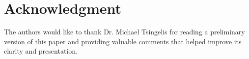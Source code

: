 \documentclass[sn-mathphys-num]{sn-jnl}%
\theoremstyle{thmstyleone}%
\theoremstyle{thmstyletwo}%
\theoremstyle{thmstylethree}%
\numberwithin{equation}{section}
\begin{document}

\section*{Acknowledgment}The authors would like to thank Dr. Michael Tsingelis for reading a preliminary version of this paper and providing valuable comments that helped improve its clarity and presentation.

\end{document}
